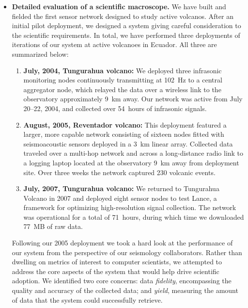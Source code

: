 \begin{itemize}

\item \textbf{Detailed evaluation of a scientific macroscope.} We have built
and fielded the first sensor network designed to study active volcanos. After
an initial pilot deployment, we designed a system giving careful
consideration to the scientific requirements. In total, we have performed
three deployments of iterations of our system at active volcanoes in Ecuador.
All three are summarized below:

\begin{enumerate}

\item \textbf{July, 2004, Tungurahua volcano:} We deployed three infrasonic
monitoring nodes continuously transmitting at 102~Hz to a central aggregator
node, which relayed the data over a wireless link to the observatory
approximately 9~km away. Our network was active from July 20--22, 2004, and
collected over 54~hours of infrasonic signals.

\item \textbf{August, 2005, Reventador volcano:} This deployment featured a
larger, more capable network consisting of sixteen nodes fitted with
seismoacoustic sensors deployed in a 3~km linear array. Collected data
traveled over a multi-hop network and across a long-distance radio link to a
logging laptop located at the observatory 9~km away from deployment site.
Over three weeks the network captured 230 volcanic events.

\item \textbf{July, 2007, Tungurahua volcano:} We returned to Tungurahua
Volcano in 2007 and deployed eight sensor nodes to test Lance, a framework
for optimizing high-resolution signal collection. The network was operational
for a total of 71~hours, during which time we downloaded 77~MB of raw data.

\end{enumerate}

Following our 2005 deployment we took a hard look at the performance of our
system from the perspective of our seismology collaborators. Rather than
dwelling on metrics of interest to computer scientists, we attempted to
address the core aspects of the system that would help drive scientific
adoption. We identified two core concerns: data \textit{fidelity},
encompassing the quality and accuracy of the collected data; and
\textit{yield}, measuring the amount of data that the system could
successfully retrieve.


\end{itemize}
